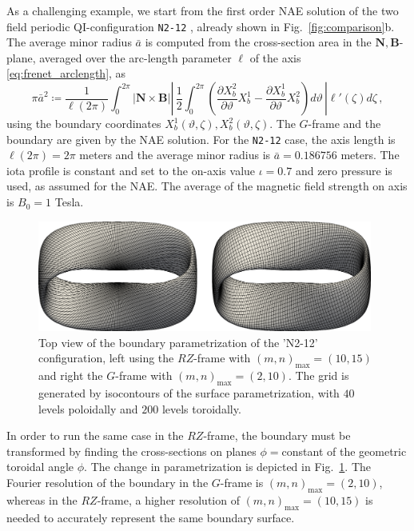 \documentclass[12pt]{iopart}
\newcommand\hlchangedrev[1]{#1} %
\newcommand\ddp[2]{\frac{\partial #1}{\partial #2}}
\newcommand\Nnew{{\bm N}}
\newcommand\Bnew{{\bm B}}
\newcommand\GFF{$G$-frame}
\newcommand\RZF{$RZ$-frame}
\newcommand{\thet}{\vartheta}
\newcommand\NBplane[1]{$\Nnew,\Bnew$-plane{#1}}
\begin{document}
As a challenging example, we start from the first order NAE solution of the two field periodic QI-configuration \texttt{N2-12} \cite{plunk2024-QI}, already shown in Fig.~\ref{fig:comparison}b. 
The average minor radius $\bar{a}$ is computed from the cross-section area in the \NBplane{}, averaged over the arc-length parameter $\ell$ of the axis \eqref{eq:frenet_arclength}, as
\begin{equation}
    \pi\bar{a}^2\coloneqq \frac{1}{\ell(2\pi)}\int_0^{2\pi}
     |\Nnew\times \Bnew|\left |\, \frac{1}{2}\int_0^{2\pi} 
    \left( \ddp{X_b^2}{\thet}X_b^1-\ddp{X_b^1}{\thet}X_b^2 \right) d\thet \,\right | \ell'(\zeta) d\zeta\,,
\end{equation}
using the boundary coordinates $X_b^1(\thet,\zeta),X_b^2(\thet,\zeta)$.
The \GFF{} and the boundary are given by the NAE solution. For the \texttt{N2-12} case, the axis length is $\ell(2\pi) = 2\pi$ meters and the average minor radius is $\bar{a}=0.186756$ meters.
The iota profile is constant and set to the on-axis value $\iota=0.7$ and zero pressure is used, as assumed for the NAE. The average of the magnetic field strength on axis is $B_0=1$ Tesla.


\begin{figure}[htbp!]
    \centering
    \includegraphics[width=0.98\textwidth]{pics/comparison_boundary_param_N2-12_RZ_frenet_landscape.png}
    \caption{Top view of the boundary parametrization of the 'N2-12' configuration, left using the \RZF{} with  $(m,n)_\text{max}=(10,15)$ and right the \GFF{} with $(m,n)_\text{max}=(2,10)$. \hlchangedrev{The grid is generated by isocontours of the surface parametrization, with $40$ levels poloidally and $200$ levels toroidally.}} 
    \label{fig:boundary_param}  
\end{figure}

In order to run the same case in the \RZF{}, the boundary must be transformed by finding the cross-sections on planes $\phi=$constant of the geometric toroidal angle $\phi$. The change in parametrization is depicted in Fig.~\ref{fig:boundary_param}. The Fourier resolution of the boundary in the \GFF{} is $(m,n)_\text{max}=(2,10)$, whereas in the \RZF{}, a higher resolution of $(m,n)_\text{max}=(10,15)$ is needed to accurately represent the same boundary surface.
\end{document}
